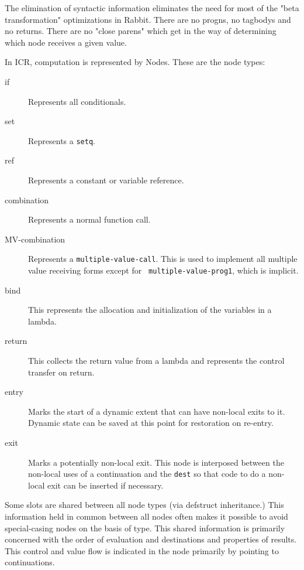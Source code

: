 The elimination of syntactic information eliminates the need for most of the
"beta transformation" optimizations in Rabbit.  There are no progns, no
tagbodys and no returns.  There are no "close parens" which get in the way of
determining which node receives a given value.

In ICR, computation is represented by Nodes.  These are the node types:
\begin{description}
\item[if]  Represents all conditionals.

\item[set] Represents a {\tt setq}.

\item[ref] Represents a constant or variable reference.

\item[combination] Represents a normal function call.

\item[MV-combination] Represents a {\tt multiple-value-call}.  This is used to
implement all multiple value receiving forms except for {\tt
multiple-value-prog1}, which is implicit.

\item[bind]
This represents the allocation and initialization of the variables in
a lambda.

\item[return]
This collects the return value from a lambda and represents the
control transfer on return.

\item[entry] Marks the start of a dynamic extent that can have non-local exits
to it.  Dynamic state can be saved at this point for restoration on re-entry.

\item[exit] Marks a potentially non-local exit.  This node is interposed
between the non-local uses of a continuation and the {\tt dest} so that code to
do a non-local exit can be inserted if necessary.
\end{description}

Some slots are shared between all node types (via defstruct inheritance.)  This
information held in common between all nodes often makes it possible to avoid
special-casing nodes on the basis of type.  This shared information is
primarily concerned with the order of evaluation and destinations and
properties of results.  This control and value flow is indicated in the node
primarily by pointing to continuations.

